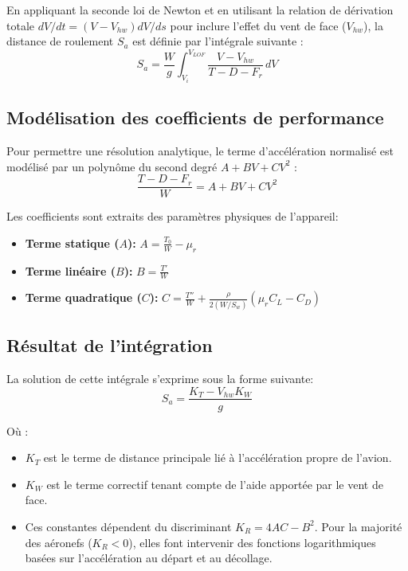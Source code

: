 	En appliquant la seconde loi de Newton et en utilisant la relation de dérivation totale $dV/dt = (V - V_{hw}) dV/ds$ pour inclure l'effet du vent de face ($V_{hw}$), la distance de roulement $S_a$ est définie par l'intégrale suivante :
	\[ S_a = \frac{W}{g} \int_{V_i}^{V_{LOF}} \frac{V - V_{hw}}{T - D - F_r} \, dV \]
	
	\vspace*{1cm}
	
	\subsection{Modélisation des coefficients de performance}
	Pour permettre une résolution analytique, le terme d'accélération normalisé est modélisé par un polynôme du second degré $A + BV + CV^2$  :
	\[ \frac{T - D - F_r}{W} = A + BV + CV^2 \]
	
	Les coefficients sont extraits des paramètres physiques de l'appareil:
	\begin{itemize}
		\item \textbf{Terme statique ($A$):} $A = \frac{T_0}{W} - \mu_r$
		\item \textbf{Terme linéaire ($B$):} $B = \frac{T'}{W}$
		\item \textbf{Terme quadratique ($C$):} $C = \frac{T''}{W} + \frac{\rho}{2(W/S_w)}(\mu_r C_L - C_D)$
	\end{itemize}
	
	\vspace*{1cm}
	
	\subsection{Résultat de l'intégration}
	La solution de cette intégrale s'exprime sous la forme suivante:
	\[ S_a = \frac{K_T - V_{hw} K_W}{g} \]
	
	Où :
	\begin{itemize}
		\item $K_T$ est le terme de distance principale lié à l'accélération propre de l'avion.
		\item $K_W$ est le terme correctif tenant compte de l'aide apportée par le vent de face.
		\item Ces constantes dépendent du discriminant $K_R = 4AC - B^2$. Pour la majorité des aéronefs ($K_R < 0$), elles font intervenir des fonctions logarithmiques basées sur l'accélération au départ et au décollage.
	\end{itemize}
	
